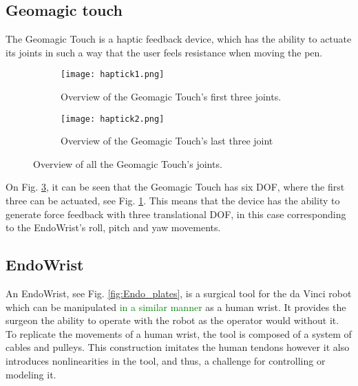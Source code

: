
\subsection{Geomagic touch}\label{sec:Geomagic_touch}
The Geomagic Touch is a haptic feedback device, which has the ability to actuate its joints in such a way that the user feels resistance when moving the pen. 


\begin{figure}[h]
  \centering
  \begin{subfigure}{.22\textwidth}
    \centering
    \texttt{[image: haptick1.png]}
    \caption{Overview of the Geomagic Touch's first three joints.}
    \label{fig:phantom1}
  \end{subfigure}
  \begin{subfigure}{.22\textwidth}
    \centering
    \texttt{[image: haptick2.png]}
    \caption{Overview of the Geomagic Touch's last three joint}
    \label{fig:phantom2}
  \end{subfigure}
\caption{Overview of all the Geomagic Touch's joints.}
\label{fig:phantom_omni}
\end{figure}


On Fig. \ref{fig:phantom_omni}, it can be seen that the Geomagic Touch has six DOF, where the first three can be actuated, see Fig. \ref{fig:phantom1}. This means that the device has the ability to generate force feedback with three translational DOF, in this case corresponding to the EndoWrist's roll, pitch and yaw movements.



    
\subsection{EndoWrist}\label{sec:EndoWrist}

An EndoWrist, see Fig. \ref{fig:Endo_plates}, is a surgical tool for the da Vinci robot which can be manipulated \textcolor{green}{in a similar manner} as a human wrist. It provides the surgeon the ability to operate with the robot as the operator would without it. To replicate the movements of a human wrist, the tool is composed of a system of cables and pulleys. This construction imitates the human tendons however it also introduces nonlinearities in the tool, and thus, a challenge for controlling or modeling it.

